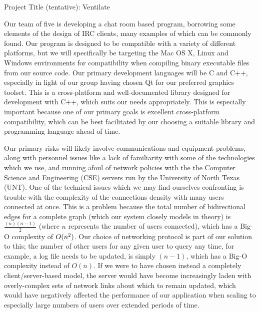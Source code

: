 \documentclass[12pt]{report}
\begin{document}
\begin{flushleft}

\begin{center}
Project Title (tentative): Ventilate
\end{center}

\setlength{\parindent}{1.27cm}

\indent \indent Our team of five is developing a chat room based program, borrowing some elements of the design of IRC clients, many examples of which can be commonly found. Our program is designed to be compatible with a variety of different platforms, but we will specifically be targeting the Mac OS X, Linux and Windows environments for compatibility when compiling binary executable files from our source code. Our primary development languages will be C and C++, especially in light of our group having chosen Qt for our preferred graphics toolset. This is a cross-platform and well-documented library designed for development with C++, which suits our needs appropriately. This is especially important because one of our primary goals is excellent cross-platform compatibility, which can be best facilitated by our choosing a suitable library and programming language ahead of time.

\indent Our primary risks will likely involve communications and equipment problems, along with personnel issues like a lack of familiarity with some of the technologies which we use, and running afoul of network policies with the the Computer Science and Engineering (CSE) servers run by the University of North Texas (UNT). One of the technical issues which we may find ourselves confronting is trouble with the complexity of the connections density with many users connected at once. This is a problem because the total number of bidirectional edges for a complete graph (which our system closely models in theory) is \(\frac{(n)(n-1)}{2}\) (where \(n\) represents the number of users connected), which has a Big-O complexity of \(O(n\textsuperscript{2})\). Our choice of networking protocol is part of our solution to this; the number of other users for any given user to query any time, for example, a log file needs to be updated, is simply \((n-1)\), which has a Big-O complexity instead of \(O(n)\). If we were to have chosen instead a completely client/server-based model, the server would have become increasingly laden with overly-complex sets of network links about which to remain updated, which would have negatively affected the performance of our application when scaling to especially large numbers of users over extended periods of time.


\end{flushleft}
\end{document}

